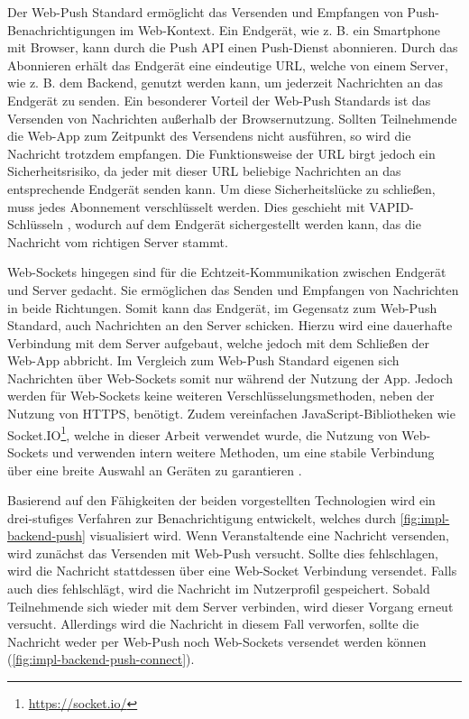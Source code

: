 Der Web-Push Standard ermöglicht das Versenden und Empfangen von
Push-Benach\-richti\-gungen im Web-Kontext. Ein Endgerät, wie z. B. ein Smartphone
mit Browser, kann durch die Push API einen Push-Dienst abonnieren. Durch das
Abonnieren erhält das Endgerät eine eindeutige URL, welche von einem Server, wie
z. B. dem Backend, genutzt werden kann, um jederzeit Nachrichten an das Endgerät
zu senden. Ein besonderer Vorteil der Web-Push Standards ist das Versenden von
Nachrichten außerhalb der Browsernutzung. Sollten Teilnehmende die Web-App zum
Zeitpunkt des Versendens nicht ausführen, so wird die Nachricht trotzdem
empfangen. Die Funktionsweise der URL birgt jedoch ein Sicherheitsrisiko, da
jeder mit dieser URL beliebige Nachrichten an das entsprechende Endgerät senden
kann. Um diese Sicherheitslücke zu schließen, muss jedes Abonnement
verschlüsselt werden. Dies geschieht mit VAPID-Schlüsseln \cite{VAPID}, wodurch
auf dem Endgerät sichergestellt werden kann, das die Nachricht vom richtigen
Server stammt.

Web-Sockets hingegen sind für die Echtzeit-Kommunikation zwischen Endgerät und
Server gedacht. Sie ermöglichen das Senden und Empfangen von Nachrichten in
beide Richtungen. Somit kann das Endgerät, im Gegensatz zum Web-Push Standard,
auch Nachrichten an den Server schicken. Hierzu wird eine dauerhafte Verbindung
mit dem Server aufgebaut, welche jedoch mit dem Schließen der Web-App abbricht.
Im Vergleich zum Web-Push Standard eigenen sich Nachrichten über Web-Sockets
somit nur während der Nutzung der App. Jedoch werden für Web-Sockets keine
weiteren Verschlüsselungsmethoden, neben der Nutzung von HTTPS, benötigt. Zudem
vereinfachen JavaScript-Bibliotheken wie Socket.IO\footnote{\url{https://socket.io/}},
welche in dieser Arbeit verwendet wurde, die Nutzung von Web-Sockets und
verwenden intern weitere Methoden, um eine stabile Verbindung über eine
breite Auswahl an Geräten zu garantieren \cite{SocketIO2022}.


Basierend auf den Fähigkeiten der beiden vorgestellten Technologien wird ein
drei-stufiges Verfahren zur Benachrichtigung entwickelt, welches durch
\autoref{fig:impl-backend-push} visualisiert wird. Wenn Veranstaltende eine
Nachricht versenden, wird zunächst das Versenden mit Web-Push versucht. Sollte
dies fehlschlagen, wird die Nachricht stattdessen über eine Web-Socket
Verbindung versendet. Falls auch dies fehlschlägt, wird die Nachricht im
Nutzerprofil gespeichert. Sobald Teilnehmende sich wieder mit dem Server
verbinden, wird dieser Vorgang erneut versucht. Allerdings wird die Nachricht in
diesem Fall verworfen, sollte die Nachricht weder per Web-Push noch Web-Sockets
versendet werden können (\autoref{fig:impl-backend-push-connect}).

